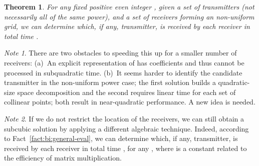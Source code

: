 \documentclass[11pt]{article}
\newtheorem{theorem}{Theorem}[section]
\theoremstyle{remark}
\newtheorem*{note}{Note}
\begin{document}
\begin{theorem}
  \label{th:2d-receivers-on-grid}
  For any fixed positive even integer , given a set  of 
  transmitters (not necessarily all of the same power), and a set  of  receivers forming an  non-uniform grid, we can determine
  which, if any, transmitter, is received by each receiver in total time .
\end{theorem}


\begin{note}
  There are two obstacles to speeding this up for a smaller number of receivers: (a)~An explicit representation of  has  coefficients and thus cannot be processed in subquadratic time.  (b)~It seems harder to identify the candidate transmitter in the non-uniform power case; the first solution builds a quadratic-size space decomposition and the second requires linear time for each set of collinear points; both result in near-quadratic performance.  A new idea is needed.
\end{note}

\begin{note}
  If we do not restrict the location of the  receivers, we can still obtain a subcubic solution by applying a different algebraic technique. Indeed, according to Fact~\ref{fact:bi:general-eval}, we can determine which, if any, transmitter, is received by each receiver in total time , for any , where  is a constant related to the efficiency of matrix multiplication.    
\end{note}
\fi
\end{document}
